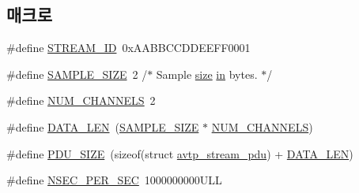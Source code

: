 \subsection*{매크로}
\begin{DoxyCompactItemize}
\item 
\#define \hyperlink{aaf-listener_8c_ade86a80a3d067dece1f7e7cf957e3e92}{S\+T\+R\+E\+A\+M\+\_\+\+ID}~0x\+A\+A\+B\+B\+C\+C\+D\+D\+E\+E\+F\+F0001
\item 
\#define \hyperlink{aaf-listener_8c_ae25e0da7cdb20c758a56dc6aece92ba7}{S\+A\+M\+P\+L\+E\+\_\+\+S\+I\+ZE}~2 /$\ast$ Sample \hyperlink{gst__avb__playbin_8c_a439227feff9d7f55384e8780cfc2eb82}{size} \hyperlink{jack_8c_afc03a33132f7c0bcacbeeeaf5b8510c0}{in} bytes. $\ast$/
\item 
\#define \hyperlink{aaf-listener_8c_ae5597ce31d23d11493e6e674fe257d73}{N\+U\+M\+\_\+\+C\+H\+A\+N\+N\+E\+LS}~2
\item 
\#define \hyperlink{aaf-listener_8c_af02e45f15080b8ec9dd7b286157617ff}{D\+A\+T\+A\+\_\+\+L\+EN}~(\hyperlink{aaf-talker_8c_ae25e0da7cdb20c758a56dc6aece92ba7}{S\+A\+M\+P\+L\+E\+\_\+\+S\+I\+ZE} $\ast$ \hyperlink{aaf-talker_8c_ae5597ce31d23d11493e6e674fe257d73}{N\+U\+M\+\_\+\+C\+H\+A\+N\+N\+E\+LS})
\item 
\#define \hyperlink{aaf-listener_8c_a4bdc13655ee7bf4cf0e66d16e22dc103}{P\+D\+U\+\_\+\+S\+I\+ZE}~(sizeof(struct \hyperlink{structavtp__stream__pdu}{avtp\+\_\+stream\+\_\+pdu}) + \hyperlink{aaf-talker_8c_af02e45f15080b8ec9dd7b286157617ff}{D\+A\+T\+A\+\_\+\+L\+EN})
\item 
\#define \hyperlink{aaf-listener_8c_a0501e82515b2bdf36453c4cc80f5e0cc}{N\+S\+E\+C\+\_\+\+P\+E\+R\+\_\+\+S\+EC}~1000000000\+U\+LL
\end{DoxyCompactItemize}

